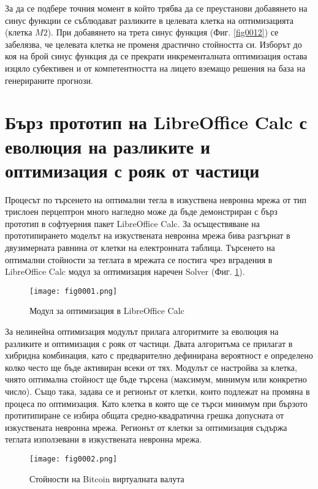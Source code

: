 За да се подбере точния момент в който трябва да се преустанови добавянето на синус функции се съблюдават разликите в целевата клетка на оптимизацията (клетка $M2$). При добавянето на трета синус функция (Фиг. \ref{fig0012}) се забелязва, че целевата клетка не променя драстично стойността си. Изборът до коя на брой синус функция да се прекрати инкременталната оптимизация остава изцяло субективен и от компетентността на лицето вземащо решения на база на генерираните прогнози. 

\section{Бърз прототип на LibreOffice Calc с еволюция на разликите и оптимизация с рояк от частици}

Процесът по търсенето на оптимални тегла в изкуствена невронна мрежа от тип трислоен перцептрон много нагледно може да бъде демонстриран с бърз прототип в софтуерния пакет LibreOffice Calc. За осъществяване на прототипирането моделът на изкуствената невронна мрежа бива разгърнат в двузимерната равнина от клетки на електронната таблица. Търсенето на оптимални стойности за теглата в мрежата се постига чрез вградения в LibreOffice Calc модул за оптимизация наречен Solver (Фиг. \ref{fig0001}).

\begin{figure}[H]
  \centering
  \texttt{[image: fig0001.png]}
  \caption{Модул за оптимизация в LibreOffice Calc}
\label{fig0001}
\end{figure}

За нелинейна оптимизация модулът прилага алгоритмите за еволюция на разликите и оптимизация с рояк от частици. Двата алгоритъма се прилагат в хибридна комбинация, като с предварително дефинирана вероятност е определено колко често ще бъде активиран всеки от тях. Модулът се настройва за клетка, чиято оптимална стойност ще бъде търсена (максимум, минимум или конкретно число). Също така, задава се и регионът от клетки, които подлежат на промяна в процеса по оптимизация. Като клетка в която ще се търси минимум при бързото протитипиране се избира общата средно-квадратична грешка допусната от изкуствената невронна мрежа. Регионът от клетки за оптимизация съдържа теглата използевани в изкуствената невронна мрежа. 

\begin{figure}[H]
  \centering
  \texttt{[image: fig0002.png]}
  \caption{Стойности на Bitcoin виртуалната валута}
\label{fig0002}
\end{figure}

